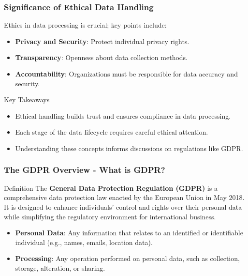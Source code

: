 \documentclass[aspectratio=169]{beamer}
\begin{document}
\begin{frame}[fragile]
    \frametitle{Significance of Ethical Data Handling}
    Ethics in data processing is crucial; key points include:

    \begin{itemize}
        \item \textbf{Privacy and Security}: Protect individual privacy rights.
        \item \textbf{Transparency}: Openness about data collection methods.
        \item \textbf{Accountability}: Organizations must be responsible for data accuracy and security.
    \end{itemize}
    
    \begin{block}{Key Takeaways}
        \begin{itemize}
            \item Ethical handling builds trust and ensures compliance in data processing.
            \item Each stage of the data lifecycle requires careful ethical attention.
            \item Understanding these concepts informs discussions on regulations like GDPR.
        \end{itemize}
    \end{block}
\end{frame}

\begin{frame}[fragile]
    \frametitle{The GDPR Overview - What is GDPR?}
    \begin{block}{Definition}
        The \textbf{General Data Protection Regulation (GDPR)} is a comprehensive data protection law enacted by the European Union in May 2018. It is designed to enhance individuals' control and rights over their personal data while simplifying the regulatory environment for international business.
    \end{block}

    \begin{itemize}
        \item \textbf{Personal Data}: Any information that relates to an identified or identifiable individual (e.g., names, emails, location data).
        \item \textbf{Processing}: Any operation performed on personal data, such as collection, storage, alteration, or sharing.
    \end{itemize}
\end{frame}
\end{document}
